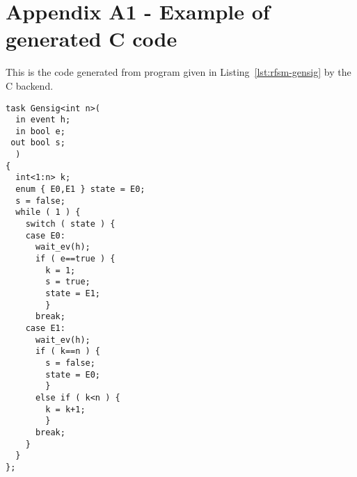 \chapter*{Appendix A1 - Example of generated C code}  
\label{cha:ex1-c}

This is the code generated from program given in Listing~\ref{lst:rfsm-gensig} by the C backend.

\begin{lstlisting}[language=ctask,frame=single,numbers=none,basicstyle=\small]
task Gensig<int n>(
  in event h;
  in bool e;
 out bool s;
  )
{
  int<1:n> k;
  enum { E0,E1 } state = E0;
  s = false;
  while ( 1 ) {
    switch ( state ) {
    case E0:
      wait_ev(h);
      if ( e==true ) {
        k = 1;
        s = true;
        state = E1;
        }
      break;
    case E1:
      wait_ev(h);
      if ( k==n ) {
        s = false;
        state = E0;
        }
      else if ( k<n ) {
        k = k+1;
        }
      break;
    }
  }
};
\end{lstlisting}
